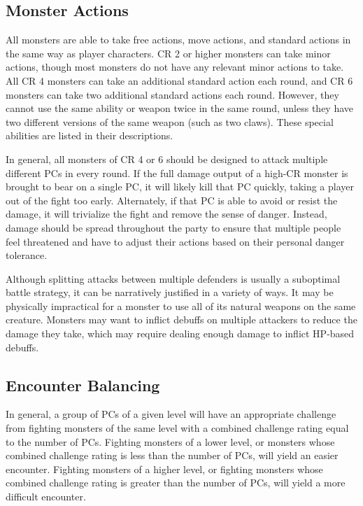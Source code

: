     \subsection{Monster Actions}\label{Monster Actions}
        All monsters are able to take free actions, move actions, and standard actions in the same way as player characters.
        CR 2 or higher monsters can take minor actions, though most monsters do not have any relevant minor actions to take.
        All CR 4 monsters can take an additional standard action each round, and CR 6 monsters can take two additional standard actions each round.
        However, they cannot use the same ability or weapon twice in the same round, unless they have two different versions of the same weapon (such as two claws).
        These special abilities are listed in their descriptions.

        In general, all monsters of CR 4 or 6 should be designed to attack multiple different PCs in every round.
        If the full damage output of a high-CR monster is brought to bear on a single PC, it will likely kill that PC quickly, taking a player out of the fight too early.
        Alternately, if that PC is able to avoid or resist the damage, it will trivialize the fight and remove the sense of danger.
        Instead, damage should be spread throughout the party to ensure that multiple people feel threatened and have to adjust their actions based on their personal danger tolerance.

        Although splitting attacks between multiple defenders is usually a suboptimal battle strategy, it can be narratively justified in a variety of ways.
        It may be physically impractical for a monster to use all of its natural weapons on the same creature.
        Monsters may want to inflict debuffs on multiple attackers to reduce the damage they take, which may require dealing enough damage to inflict HP-based debuffs.

    \subsection{Encounter Balancing}\label{Encounter Balancing}
        In general, a group of PCs of a given level will have an appropriate challenge from fighting monsters of the same level with a combined challenge rating equal to the number of PCs.
        Fighting monsters of a lower level, or monsters whose combined challenge rating is less than the number of PCs, will yield an easier encounter.
        Fighting monsters of a higher level, or fighting monsters whose combined challenge rating is greater than the number of PCs, will yield a more difficult encounter.

